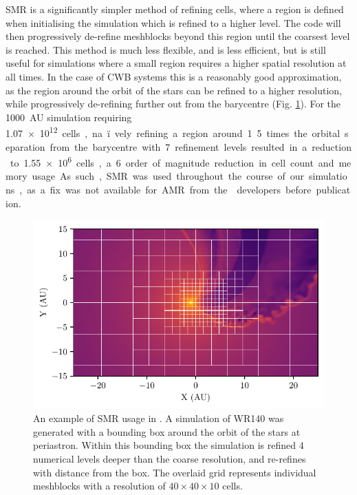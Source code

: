 SMR is a significantly simpler method of refining cells, where a region is defined when initialising the simulation which is refined to a higher level.
The code will then progressively de-refine meshblocks beyond this region until the coarsest level is reached.
This method is much less flexible, and is less efficient, but is still useful for simulations where a small region requires a higher spatial resolution at all times. 
In the case of CWB systems this is a reasonably good approximation, as the region around the orbit of the stars can be refined to a higher resolution, while progressively de-refining further out from the barycentre (Fig. \ref{fig:smr-example}).
For the \SI{1000}{AU} simulation requiring \SI{1.07e12} cells, na\"ively refining a region around 1.5 times the orbital separation from the barycentre with 7 refinement levels resulted in a reduction to \num{1.55e6} cells, a 6 order of magnitude reduction in cell count and memory usage.
As such, SMR was used throughout the course of our simulations, as a fix was not available for AMR from the \athena{} developers before publication.

\begin{figure}[ht]
  \centering
  \includegraphics{assets/refinement/wr140/gridref.pdf}
  \caption[Static mesh refinement in \athena]{An example of SMR usage in \athena. A simulation of WR140 was generated with a bounding box around the orbit of the stars at periastron. Within this bounding box the simulation is refined 4 numerical levels deeper than the coarse resolution, and re-refines with distance from the box. The overlaid grid represents individual meshblocks with a resolution of $40\times 40 \times 10$ cells.}
  \label{fig:smr-example}
\end{figure}

